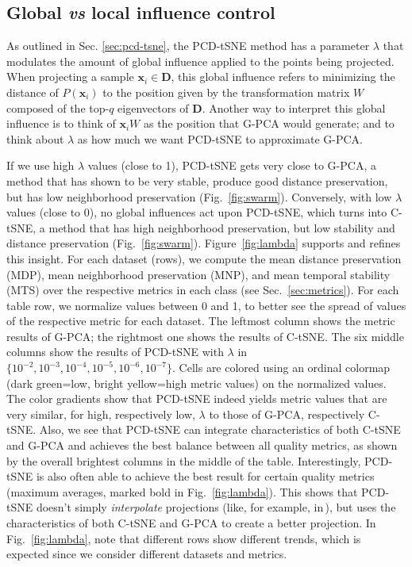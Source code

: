 \subsection{Global \emph{vs} local influence control}
\label{sec:lambda}

As outlined in Sec. \ref{sec:pcd-tsne}, the PCD-tSNE method has a parameter $\lambda$ that modulates the amount of global influence applied to the points being projected. 
When projecting a sample $\mathbf{x}_i \in \mathbf{D}$, this global influence refers to minimizing the distance of $P(\mathbf{x}_i)$ to the position given by the transformation matrix $W$ composed of the top-$q$ eigenvectors of $\mathbf{D}$. 
Another way to interpret this global influence is to think of $\mathbf{x}_{i} W$ as the position that G-PCA would generate; and to think about $\lambda$ as how much we want PCD-tSNE to approximate G-PCA.

If we use high $\lambda$ values (close to 1), PCD-tSNE gets very close to G-PCA, a method that has shown to be very stable, produce good distance preservation, but has low neighborhood preservation (Fig.~\ref{fig:swarm}). Conversely, 
with low $\lambda$ values (close to 0), no global influences act upon PCD-tSNE, which turns into C-tSNE, a method that has high neighborhood preservation, but low stability and distance preservation (Fig.~\ref{fig:swarm}). 
Figure~\ref{fig:lambda} supports and refines this insight. For each dataset (rows), we compute the mean distance preservation (MDP), mean neighborhood preservation (MNP), and mean temporal stability (MTS) over the respective metrics in each class (see Sec.~\ref{sec:metrics}). For each table row, we normalize values between 0 and 1, to better see the spread of values of the respective metric for each dataset.
The leftmost column shows the metric results of G-PCA; the rightmost one shows the results of C-tSNE. The six middle columns
show the results of PCD-tSNE with $\lambda$ in $\{10^{-2}, 10^{-3}, 10^{-4}, 10^{-5}, 10^{-6}, 10^{-7}\}$. Cells are colored using an ordinal colormap (dark green=low, bright yellow=high metric values) on the normalized values. The color gradients show that PCD-tSNE indeed yields metric values that are very similar, for high, respectively low, $\lambda$ to those of G-PCA, respectively C-tSNE. Also, we see that PCD-tSNE can integrate characteristics of both C-tSNE and G-PCA and achieves the best balance between all quality metrics, as shown by the overall brightest columns in the middle of the table. Interestingly, PCD-tSNE is also often able to achieve the best result for certain quality metrics (maximum averages, marked bold in Fig.~\ref{fig:lambda}). This shows that PCD-tSNE doesn't simply \emph{interpolate} projections (like, for example, in\,\cite{kruiger_mdpi}), but uses the characteristics of both C-tSNE and G-PCA to create a better projection. In Fig.~\ref{fig:lambda}, note that different rows show different trends, which is expected since we consider different datasets and metrics. 

